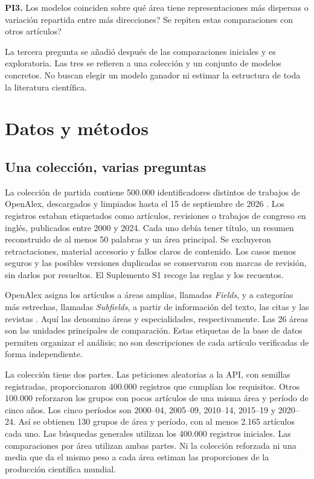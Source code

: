 \textbf{PI3.} \textquestiondown{}Los modelos coinciden sobre qué área tiene representaciones más dispersas o variación repartida entre más direcciones? \textquestiondown{}Se repiten estas comparaciones con otros artículos?

La tercera pregunta se añadió después de las comparaciones iniciales y es exploratoria. Las tres se refieren a una colección y un conjunto de modelos concretos. No buscan elegir un modelo ganador ni estimar la estructura de toda la literatura científica.

\section{Datos y métodos}
\subsection{Una colección, varias preguntas}
La colección de partida contiene 500.000 identificadores distintos de trabajos de OpenAlex, descargados y limpiados hasta el 15 de septiembre de 2026 \citep{priem2022openalex}. Los registros estaban etiquetados como artículos, revisiones o trabajos de congreso en inglés, publicados entre 2000 y 2024. Cada uno debía tener título, un resumen reconstruido de al menos 50 palabras y un área principal. Se excluyeron retractaciones, material accesorio y fallos claros de contenido. Los casos menos seguros y las posibles versiones duplicadas se conservaron con marcas de revisión, sin darlos por resueltos. El Suplemento S1 recoge las reglas y los recuentos.

OpenAlex asigna los artículos a áreas amplias, llamadas \emph{Fields}, y a categorías más estrechas, llamadas \emph{Subfields}, a partir de información del texto, las citas y las revistas \citep{openalex2026topics}. Aquí las denomino áreas y especialidades, respectivamente. Las 26 áreas son las unidades principales de comparación. Estas etiquetas de la base de datos permiten organizar el análisis; no son descripciones de cada artículo verificadas de forma independiente.

La colección tiene dos partes. Las peticiones aleatorias a la API, con semillas registradas, proporcionaron 400.000 registros que cumplían los requisitos. Otros 100.000 reforzaron los grupos con pocos artículos de una misma área y período de cinco años. Los cinco períodos son 2000--04, 2005--09, 2010--14, 2015--19 y 2020--24. Así se obtienen 130 grupos de área y período, con al menos 2.165 artículos cada uno. Las búsquedas generales utilizan los 400.000 registros iniciales. Las comparaciones por área utilizan ambas partes. Ni la colección reforzada ni una media que da el mismo peso a cada área estiman las proporciones de la producción científica mundial.

